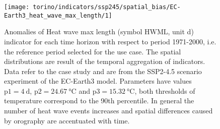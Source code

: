 \begin{figure}[h]
  \centering
  \texttt{[image: torino/indicators/ssp245/spatial\_bias/EC-Earth3\_heat\_wave\_max\_length/1]}
  \caption{Anomalies of {Heat wave max length} (symbol $\mathrm{HWML}$, unit \unit{\day}) indicator for each time horizon with respect to period 1971-2000, i.e. the reference period selected for the use case. The spatial distributions are result of the temporal aggregation of indicators. Data refer to the case study and are from the SSP2-4.5 scenario experiment of the EC-Earth3 model. Parameters have values $\mathrm{p1} = \qty{4}{\day}$, $\mathrm{p2} = \qty{24.67}{\degreeCelsius}$ and $\mathrm{p3} = \qty{15.32}{\degreeCelsius}$, both thresholds of temperature correspond to the 90th percentile. In general the number of heat wave events increases and spatial differences caused by orography are accentuated with time.}
  \label{fig:spatial_bias_EC-Earth3_heat_wave_max_length}
\end{figure}

